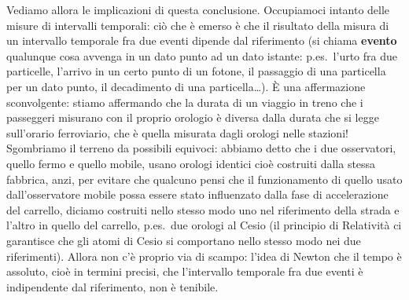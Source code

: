 Vediamo allora le implicazioni di questa conclusione. Occupiamoci intanto delle
misure di intervalli temporali: ci\`o che \`e emerso \`e che il risultato della
misura di un intervallo temporale fra due eventi dipende dal riferimento (si
chiama \textbf{evento} qualunque cosa avvenga in un dato punto ad un dato
istante: p.es.\ l'urto fra due particelle, l'arrivo in un certo punto di un
fotone, il passaggio di una particella per un dato punto, il decadimento di una
particella\dots). \`E una affermazione sconvolgente: stiamo affermando che la
durata di un viaggio in treno che i passeggeri misurano con il proprio orologio
\`e diversa dalla durata che si legge sull'orario ferroviario, che \`e quella
misurata dagli orologi nelle stazioni! Sgombriamo il terreno da possibili
equivoci: abbiamo detto che i due osservatori, quello fermo e quello mobile,
usano orologi identici cio\`e costruiti dalla stessa fabbrica, anzi, per evitare
che qualcuno pensi che il funzionamento di quello usato dall'osservatore mobile
possa essere stato influenzato dalla fase di accelerazione del carrello, diciamo
costruiti nello stesso modo uno nel riferimento della strada e l'altro in quello
del carrello, p.es.\ due orologi al Cesio (il principio di Relativit\`a ci
garantisce che gli atomi di Cesio si comportano nello stesso modo nei due
riferimenti). Allora non c'\`e proprio via di scampo: l'idea di Newton che il
tempo \`e assoluto, cio\`e in termini precisi, che l'intervallo temporale fra
due eventi \`e indipendente dal riferimento, non \`e tenibile.


